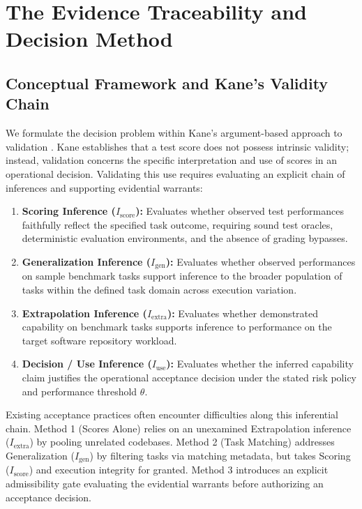 \documentclass[runningheads]{llncs}
\begin{document}
\section{The Evidence Traceability and Decision Method}
\label{sec:method}

\subsection{Conceptual Framework and Kane's Validity Chain}
We formulate the decision problem within Kane's argument-based approach to validation \cite{kane_validation}. Kane establishes that a test score does not possess intrinsic validity; instead, validation concerns the specific interpretation and use of scores in an operational decision. Validating this use requires evaluating an explicit chain of inferences and supporting evidential warrants:
\begin{enumerate}[leftmargin=*]
    \item \textbf{Scoring Inference ($I_{\text{score}}$):} Evaluates whether observed test performances faithfully reflect the specified task outcome, requiring sound test oracles, deterministic evaluation environments, and the absence of grading bypasses.
    \item \textbf{Generalization Inference ($I_{\text{gen}}$):} Evaluates whether observed performances on sample benchmark tasks support inference to the broader population of tasks within the defined task domain across execution variation.
    \item \textbf{Extrapolation Inference ($I_{\text{extra}}$):} Evaluates whether demonstrated capability on benchmark tasks supports inference to performance on the target software repository workload.
    \item \textbf{Decision / Use Inference ($I_{\text{use}}$):} Evaluates whether the inferred capability claim justifies the operational acceptance decision under the stated risk policy and performance threshold $\theta$.
\end{enumerate}

Existing acceptance practices often encounter difficulties along this inferential chain. Method 1 (Scores Alone) relies on an unexamined Extrapolation inference ($I_{\text{extra}}$) by pooling unrelated codebases. Method 2 (Task Matching) addresses Generalization ($I_{\text{gen}}$) by filtering tasks via matching metadata, but takes Scoring ($I_{\text{score}}$) and execution integrity for granted. Method 3 introduces an explicit admissibility gate evaluating the evidential warrants before authorizing an acceptance decision.
\end{document}
